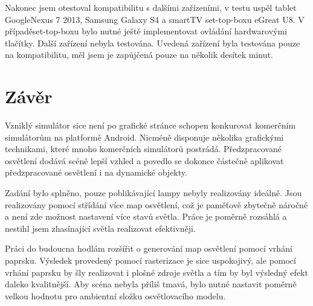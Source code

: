 \documentclass[11pt,twoside,a4paper]{book}
\begin{document}
Nakonec jsem otestoval kompatibilitu s dalšími zařízeními, v testu uspěl tablet Google\linebreak Nexus 7 2013, Samsung Galaxy S4 a smartTV set-top-boxu eGreat U8. V případě\linebreak set-top-boxu bylo nutné ještě implementovat ovládání hardwarovými tlačítky. Další zařízení nebyla testována. Uvedená zařízení byla testována pouze na kompatibilitu, měl jsem je zapůjčená pouze na několik desítek minut.

\chapter{Závěr}
Vzniklý simulátor sice není po grafické stránce schopen konkurovat komerčním simulátorům na platformě Android. Nicméně disponuje několika grafickými technikami, které mnoho komerčních simulátorů postrádá. Předzpracované osvětlení dodává scéně lepší vzhled a povedlo se dokonce částečně aplikovat předzpracované osvětlení i na dynamické objekty.

Zadání bylo splněno, pouze poblikávající lampy nebyly realizovány ideálně. Jsou realizovány pomocí střídání více map osvětlení, což je paměťově zbytečně náročné a není zde možnost nastavení více stavů světla. Práce je poměrně rozsáhlá a nestihl jsem zhasínající světla realizovat efektivněji.

Práci do budoucna hodlám rozšířit o generování map osvětlení pomocí vrhání paprsku. Výsledek provedený pomocí rasterizace je sice uspokojivý, ale pomocí vrhání paprsku by šly realizovat i plošné zdroje světla a tím by byl výsledný efekt daleko kvalitnější. Aby scéna nebyla příliš tmavá, bylo nutné nastavit poměrně velkou hodnotu pro ambientní složku osvětlovacího modelu.


%
%
%

{
\def\CS{$\cal C\kern-0.1667em\lower.5ex\hbox{$\cal S$}\kern-0.075em $}

}
\end{document}

